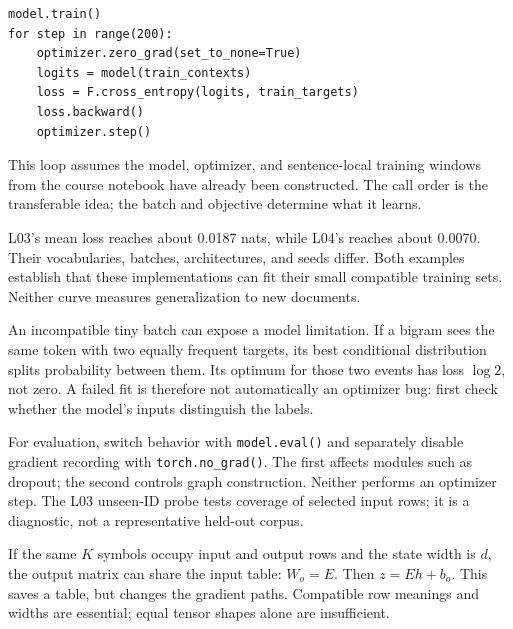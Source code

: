 \begin{lstlisting}
model.train()
for step in range(200):
    optimizer.zero_grad(set_to_none=True)
    logits = model(train_contexts)
    loss = F.cross_entropy(logits, train_targets)
    loss.backward()
    optimizer.step()
\end{lstlisting}
This loop assumes the model, optimizer, and sentence-local training windows
from the course notebook have already been constructed. The call order is
the transferable idea; the batch and objective determine what it learns.


L03's mean loss reaches about 0.0187 nats, while L04's reaches about
0.0070. Their vocabularies, batches, architectures, and seeds differ.
Both examples establish that these implementations can fit their small
compatible training sets. Neither curve measures generalization to new documents.

An incompatible tiny batch can expose a model limitation. If a bigram sees
the same token with two equally frequent targets, its best conditional
distribution splits probability between them. Its optimum for those two
events has loss $\log2$, not zero. A failed fit is therefore not automatically
an optimizer bug: first check whether the model's inputs distinguish the labels.

For evaluation, switch behavior with \texttt{model.eval()} and separately
disable gradient recording with \texttt{torch.no\_grad()}. The first affects
modules such as dropout; the second controls graph construction. Neither
performs an optimizer step. The L03 unseen-ID probe tests coverage of selected
input rows; it is a diagnostic, not a representative held-out corpus.


If the same $K$ symbols occupy input and output rows and the state width is
$d$, the output matrix can share the input table: $W_o=E$. Then
$z=Eh+b_o$. This saves a table, but changes the gradient paths. Compatible
row meanings and widths are essential; equal tensor shapes alone are insufficient.


